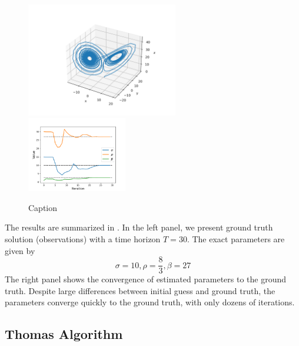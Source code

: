 \documentclass[3p,preprint,12pt]{elsarticle}
\begin{document}
\begin{figure}
    \centering
    \includegraphics[width=0.59\textwidth]{paper/Kailai/figures/lorentz.png}~
    \includegraphics[width=0.39\textwidth]{paper/Kailai/figures/lorentz_converge.png}
    \caption{Caption}
    \label{fig:rv-lorentz}
\end{figure}

The results are summarized in . In the left panel, we present ground truth solution (observations) with a time horizon $T=30$. The exact parameters are given by 
$$\sigma = 10, \rho = \frac{8}{3}, \beta = 27$$
The right panel shows the convergence of estimated parameters to the ground truth. Despite large differences between initial guess and ground truth, the parameters converge quickly to the ground truth, with only dozens of iterations. 

\subsection{Thomas Algorithm}
\end{document}
